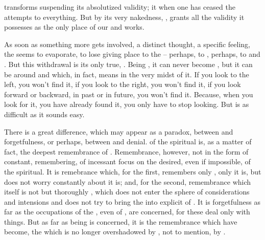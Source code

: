 
\pa {} transforms  suspending its absolutized
validity; it  when one has ceased the attempts to
 everything. 
But by its very nakedness, ,  grants 
all the validity it possesses as the only place of our  and works. 

As soon as something more  gets involved, a distinct
thought, a specific feeling, the  seems to evaporate, to
lose  giving 
place to the  -- perhaps, to , perhaps, to
  and .
But this withdrawal is its only true, .
Being , it can never become , but it can be
 around and  which, in fact, means in
the very midst of it.
If you look to the left, you won't find
it, if you look to the right, you won't find it, if you look forward
or backward, in past or in future, you won't find it.  Because, when
you look for it, you have already found it, you only have to stop
looking.  
But  is as difficult as it sounds easy.


\pa There is a great difference, which may appear as a paradox,
between  and forgetfulness, or perhaps, between
 and denial.  of the spiritual is,
as a matter of fact, the deepest remembrance of
. Remembrance, however, not in the form of constant,
 remembering, of incessant focus on the desired, even if
impossible,  of the spiritual. It is remebrance which,
for the first, remembers only , only  it is, but
does not worry constantly about  it is; and, for the second,
remembrance which itself is not  but thoroughly
, which does not enter the sphere of 
considerations and intensions and does not try to bring the 
into explicit  of \herenow. 
It is forgetfulness as far as 
the  occupations of the , even of , are
concerned, for these deal only with  things. But as far as
 being is concerned, it is the remembrance which  have become,
the  which is no longer overshadowed by , not to mention,
by . 

